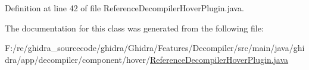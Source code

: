 Definition at line 42 of file Reference\+Decompiler\+Hover\+Plugin.\+java.



The documentation for this class was generated from the following file\+:\begin{DoxyCompactItemize}
\item 
F\+:/re/ghidra\+\_\+sourcecode/ghidra/\+Ghidra/\+Features/\+Decompiler/src/main/java/ghidra/app/decompiler/component/hover/\mbox{\hyperlink{_reference_decompiler_hover_plugin_8java}{Reference\+Decompiler\+Hover\+Plugin.\+java}}\end{DoxyCompactItemize}

